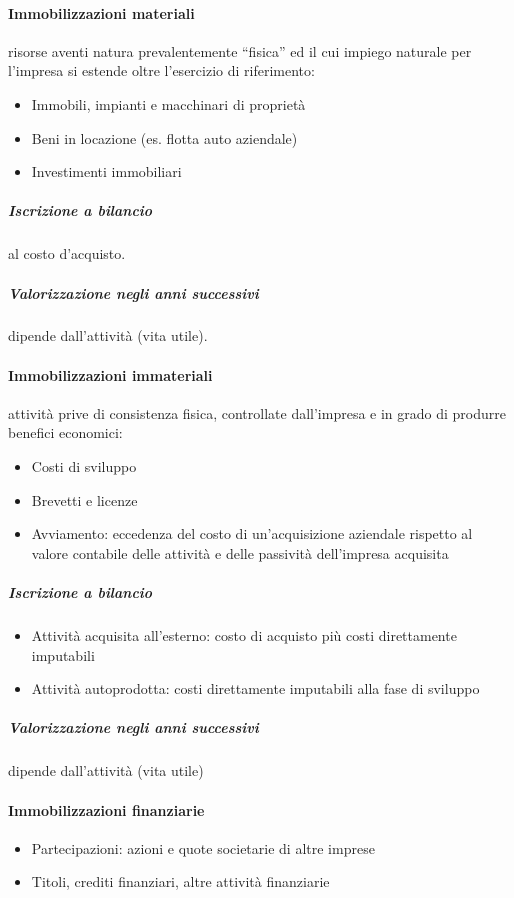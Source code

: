 \documentclass[10pt,a4paper,fleqn,oneside]{book}
\begin{document}
\paragraph{Immobilizzazioni materiali} risorse aventi natura prevalentemente ``fisica''
ed il cui impiego naturale per l’impresa si estende oltre l’esercizio di riferimento:
\begin{itemize}
    \item Immobili, impianti e macchinari di proprietà
    \item Beni in locazione (es. flotta auto aziendale)
    \item Investimenti immobiliari
\end{itemize}

\subparagraph{Iscrizione a bilancio} al costo d'acquisto.
\subparagraph{Valorizzazione negli anni successivi} dipende dall’attività (vita utile).

\paragraph{Immobilizzazioni immateriali} attività prive di consistenza fisica, controllate
dall’impresa e in grado di produrre benefici economici:
\begin{itemize}
    \item Costi di sviluppo
    \item Brevetti e licenze
    \item Avviamento: eccedenza del costo di un’acquisizione aziendale rispetto
    al valore contabile delle attività e delle passività dell’impresa acquisita
\end{itemize}

\subparagraph{Iscrizione a bilancio}
\begin{itemize}
    \item Attività acquisita all’esterno: costo di acquisto più costi direttamente imputabili
    \item Attività autoprodotta: costi direttamente imputabili alla fase di sviluppo
\end{itemize}

\subparagraph{Valorizzazione negli anni successivi} dipende dall’attività (vita utile)

\paragraph{Immobilizzazioni finanziarie}
\begin{itemize}
    \item Partecipazioni: azioni e quote societarie di altre imprese
    \item Titoli, crediti finanziari, altre attività finanziarie
\end{itemize}
\end{document}
